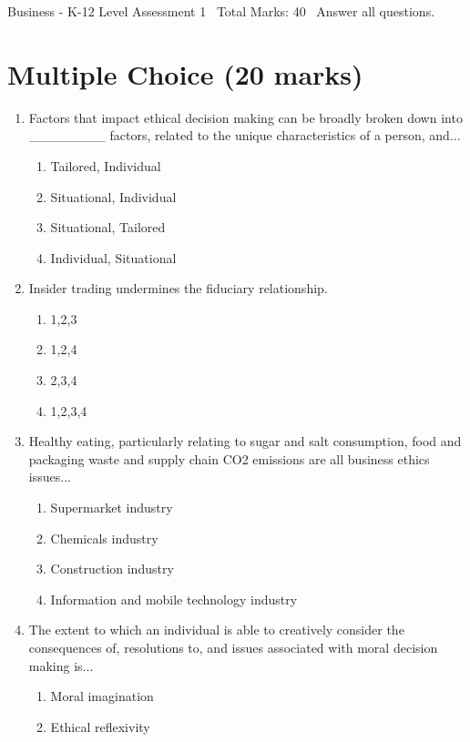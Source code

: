 \documentclass[12pt]{article}
\begin{document}
\begin{center}
Business - K-12 Level Assessment 1 \
Total Marks: 40 \
Answer all questions.
\end{center}

\section*{Multiple Choice (20 marks)}
\begin{enumerate}[label=\arabic*.]
\item Factors that impact ethical decision making can be broadly broken down into \_\_\_\_\_\_\_\_ factors, related to the unique characteristics of a person, and...
\begin{enumerate}[label=(\alph*)]
    \item Tailored, Individual
    \item Situational, Individual
    \item Situational, Tailored
    \item Individual, Situational
\end{enumerate}
\item Insider trading undermines the fiduciary relationship.
\begin{enumerate}[label=(\alph*)]
    \item 1,2,3
    \item 1,2,4
    \item 2,3,4
    \item 1,2,3,4
\end{enumerate}
\item Healthy eating, particularly relating to sugar and salt consumption, food and packaging waste and supply chain CO2 emissions are all business ethics issues...
\begin{enumerate}[label=(\alph*)]
    \item Supermarket industry
    \item Chemicals industry
    \item Construction industry
    \item Information and mobile technology industry
\end{enumerate}
\item The extent to which an individual is able to creatively consider the consequences of, resolutions to, and issues associated with moral decision making is...
\begin{enumerate}[label=(\alph*)]
    \item Moral imagination
    \item Ethical reflexivity

\end{enumerate}
\end{enumerate}
\end{document}
